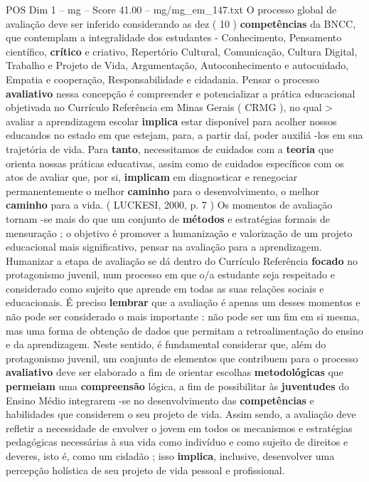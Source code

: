 \begin{textsample}{POS Dim 1 – mg – Score 41.00 – mg/mg\_em\_147.txt}
O processo global de avaliação deve ser inferido considerando as dez ( 10 ) \textbf{competências} da BNCC, que contemplam a integralidade dos estudantes - Conhecimento, Pensamento científico, \textbf{crítico} e criativo, Repertório Cultural, Comunicação, Cultura Digital, Trabalho e Projeto de Vida, Argumentação, Autoconhecimento e autocuidado, Empatia e cooperação, Responsabilidade e cidadania.
Pensar o processo \textbf{avaliativo} nessa concepção é compreender e potencializar a prática educacional objetivada no Currículo Referência em Minas Gerais ( CRMG ), no qual > avaliar a aprendizagem escolar \textbf{implica} estar disponível para acolher nossos educandos no estado em que estejam, para, a partir daí, poder auxiliá -los em sua trajetória de vida.
Para \textbf{tanto}, necessitamos de cuidados com a \textbf{teoria} que orienta nossas práticas educativas, assim como de cuidados específicos com os atos de avaliar que, por si, \textbf{implicam} em diagnosticar e renegociar permanentemente o melhor \textbf{caminho} para o desenvolvimento, o melhor \textbf{caminho} para a vida. ( LUCKESI, 2000, p. 7 ) Os momentos de avaliação tornam -se mais do que um conjunto de \textbf{métodos} e estratégias formais de mensuração ; o objetivo é promover a humanização e valorização de um projeto educacional mais significativo, pensar na avaliação para a aprendizagem.
Humanizar a etapa de avaliação se dá dentro do Currículo Referência \textbf{focado} no protagonismo juvenil, num processo em que o/a estudante seja respeitado e considerado como sujeito que aprende em todas as suas relações sociais e educacionais.
É preciso \textbf{lembrar} que a avaliação é apenas um desses momentos e não pode ser considerado o mais importante : não pode ser um fim em si mesma, mas uma forma de obtenção de dados que permitam a retroalimentação do ensino e da aprendizagem.
Neste sentido, é fundamental considerar que, além do protagonismo juvenil, um conjunto de elementos que contribuem para o processo \textbf{avaliativo} deve ser elaborado a fim de orientar escolhas \textbf{metodológicas} que \textbf{permeiam} uma \textbf{compreensão} lógica, a fim de possibilitar às \textbf{juventudes} do Ensino Médio integrarem -se no desenvolvimento das \textbf{competências} e habilidades que considerem o seu projeto de vida.
Assim sendo, a avaliação deve refletir a necessidade de envolver o jovem em todos os mecanismos e estratégias pedagógicas necessárias à sua vida como indivíduo e como sujeito de direitos e deveres, isto é, como um cidadão ; isso \textbf{implica}, inclusive, desenvolver uma percepção holística de seu projeto de vida pessoal e profissional.

\end{textsample}
